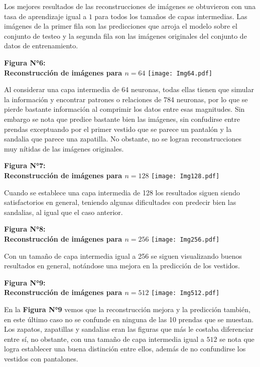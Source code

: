 \documentclass[12pt,a4paper]{article}
\begin{document}
\begin{multicols}{2}
Los mejores resultados de las reconstrucciones de imágenes se obtuvieron con una tasa de aprendizaje igual a $1$ para todos los tamaños de capas intermedias. Las imágenes de la primer fila son las predicciones que arroja el modelo sobre el conjunto de testeo y la segunda fila son las imágenes originales del conjunto de datos de entrenamiento.

\begin{center}
\textbf{Figura N°6: \\ Reconstrucción de imágenes para $n=64$}
\texttt{[image: Img64.pdf]}
\end{center}

Al considerar una capa intermedia de 64 neuronas, todas ellas tienen que simular la información y encontrar patrones o relaciones de 784 neuronas, por lo que se pierde bastante información al comprimir los datos entre esas magnitudes. Sin embargo se nota que predice bastante bien las imágenes, sin confudirse entre prendas exceptuando por el primer vestido que se parece un pantalón y la sandalia que parece una zapatilla. No obstante, no se logran reconstrucciones muy nítidas de las imágenes originales.

\begin{center}
\textbf{Figura N°7: \\ Reconstrucción de imágenes para $n=128$}
\texttt{[image: Img128.pdf]}
\end{center}



Cuando se establece una capa intermedia de 128 los resultados siguen siendo satisfactorios en general, teniendo algunas dificultades con predecir bien las sandalias, al igual que el caso anterior. 

\begin{center}
\textbf{Figura N°8: \\ Reconstrucción de imágenes para $n=256$}
\texttt{[image: Img256.pdf]}
\end{center}

Con un tamaño de capa intermedia igual a 256 se siguen visualizando buenos resultados en general, notándose una mejora en la predicción de los vestidos.
\vspace*{5cm}
\begin{center}
\textbf{Figura N°9: \\ Reconstrucción de imágenes para $n=512$}
\texttt{[image: Img512.pdf]}
\end{center}

En la \textbf{Figura N°9} vemos que la reconstrucción mejora y la predicción también, en este último caso no se confunde en ninguna de las 10 prendas que se muestan. Los zapatos, zapatillas y sandalias eran las figuras que más le costaba diferenciar entre sí, no obstante, con una tamaño de capa intermedia igual a $512$ se nota que logra establecer una buena distinción entre ellos, además de no confundirse los vestidos con pantalones.


\end{multicols}
\end{document}
